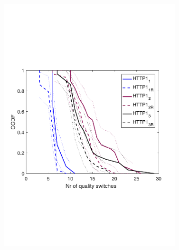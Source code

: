 \begin{figure}[t!]
\begin{subfigure}[t]{0.33\textwidth}
    \includegraphics[trim={0 7cm 0 7cm}, scale=0.25]{figures/CDF_cntswitch_squad_parallel_http1_nd18.pdf}
    \caption{}
    \label{fig:phttp1cntsw}
  \end{subfigure}
  \begin{subfigure}[t]{0.33\textwidth}
  \captionsetup{justification=centering,margin=1.5cm}

\end{subfigure}
\end{figure}
